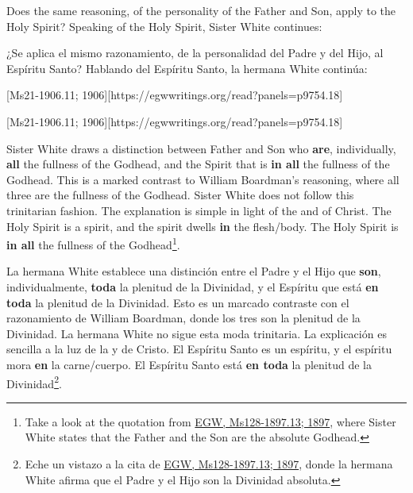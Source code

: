 Does the same reasoning, of the personality of the Father and Son, apply to the Holy Spirit? Speaking of the Holy Spirit, Sister White continues:


¿Se aplica el mismo razonamiento, de la personalidad del Padre y del Hijo, al Espíritu Santo? Hablando del Espíritu Santo, la hermana White continúa:


[Ms21-1906.11; 1906][https://egwwritings.org/read?panels=p9754.18]


[Ms21-1906.11; 1906][https://egwwritings.org/read?panels=p9754.18]


Sister White draws a distinction between Father and Son who \textbf{are}, individually, \textbf{all} the fullness of the Godhead, and the Spirit that is \textbf{in all} the fullness of the Godhead. This is a marked contrast to William Boardman’s reasoning, where all three are the fullness of the Godhead. Sister White does not follow this trinitarian fashion. The explanation is simple in light of the  and of Christ. The Holy Spirit is a spirit, and the spirit dwells \textbf{in} the flesh/body. The Holy Spirit is \textbf{in all} the fullness of the Godhead\footnote{Take a look at the quotation from \href{https://egwwritings.org/?ref=en_Ms128-1897.13&para=5426.19}{{EGW, Ms128-1897.13; 1897}}, where Sister White states that the Father and the Son are the absolute Godhead.}.


La hermana White establece una distinción entre el Padre y el Hijo que \textbf{son}, individualmente, \textbf{toda} la plenitud de la Divinidad, y el Espíritu que está \textbf{en toda} la plenitud de la Divinidad. Esto es un marcado contraste con el razonamiento de William Boardman, donde los tres son la plenitud de la Divinidad. La hermana White no sigue esta moda trinitaria. La explicación es sencilla a la luz de la  y de Cristo. El Espíritu Santo es un espíritu, y el espíritu mora \textbf{en} la carne/cuerpo. El Espíritu Santo está \textbf{en toda} la plenitud de la Divinidad\footnote{Eche un vistazo a la cita de \href{https://egwwritings.org/?ref=en_Ms128-1897.13&para=5426.19}{{EGW, Ms128-1897.13; 1897}}, donde la hermana White afirma que el Padre y el Hijo son la Divinidad absoluta.}.


